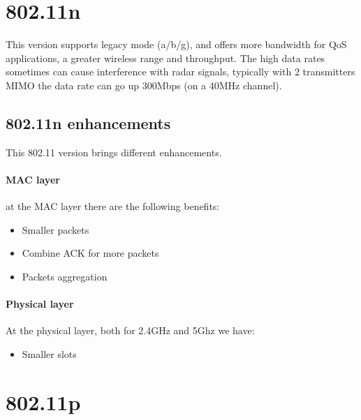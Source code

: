 \section{802.11n}

This version supports legacy mode (a/b/g), and offers more bandwidth for QoS
applications, a greater wireless range and throughput.
The high data rates sometimes can cause interference with radar signals,
typically with 2 transmitters MIMO the data rate can go up 300Mbps (on a 40MHz
channel).

\subsection{802.11n enhancements}

This 802.11 version brings different enhancements.

\paragraph*{MAC layer} at the MAC layer there are the following benefits:
\begin{itemize}
\item Smaller packets
\item Combine ACK for more packets
\item Packets aggregation
\end{itemize}

\paragraph*{Physical layer} At the physical layer, both for 2.4GHz and 5Ghz we have:
\begin{itemize}
\item Smaller slots
\end{itemize}

\section{802.11p}
